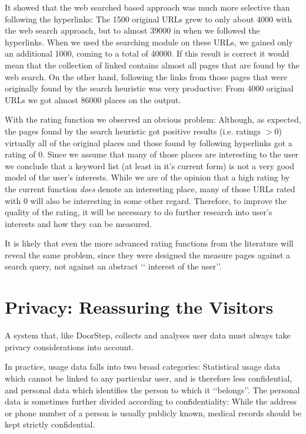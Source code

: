 \documentclass[a4paper,twoside]{danarticle}
\theoremstyle{remark}
\begin{document}
      It showed that the web searched based approach was much more selective
      than following the hyperlinks: The 1500 original URLs grew to only about 
      4000
      with the web search approach, but to almost 39000 in when we followed the
      hyperlinks. When we used the searching module on these URLs, we gained
      only an additional 1000, coming to a total of 40000. If this result is
      correct it would mean that the collection of linked contains almost all
      pages that are found by the web search. On the other hand, following the
      links from those pages that were originally found by the search heuristic
      was very productive: From 4000 original URLs we got almost 86000 places on
      the output.
      
      With the rating function we observed an obvious problem: Although, as
      expected, the pages found by the search heuristic got positive results
      (i.e. ratings $ > 0 $) virtually all of the original places and those
      found by following hyperlinks got a rating of 0. Since we assume that many
      of those places are interesting to the user we conclude that a keyword
      list (at least in it's current form) is not a very good model of the
      user's interests. While we are of the opinion that a high rating by the
      current function \emph{does} denote an interesting place, many of those
      URLs rated with 0 will also be interesting in some other regard.
      Therefore, to improve the quality of the rating, it will be necessary to
      do further research into user's interests and how they can be measured.
      
      It is likely that even the more advanced rating functions from the
      literature will reveal the same problem, since they were designed the
      measure pages against a search query, not against an abstract \lq\lq
      interest of the user\rq\rq .
  \section{Privacy: Reassuring the Visitors}
    A system that, like DoorStep, collects and analyses user data must always 
    take privacy considerations into account. 
    
    In practice, usage data falls into two broad categories: Statistical usage 
    data which cannot be linked to any particular user, and is therefore less 
    confidential, and personal data which identifies the 
    person to which it \lq\lq belongs\rq\rq . The personal data is 
    sometimes further divided according to confidentiality: While the address or 
    phone number of a person is usually publicly known, medical records should 
    be kept strictly confidential. 
    
\end{document}
